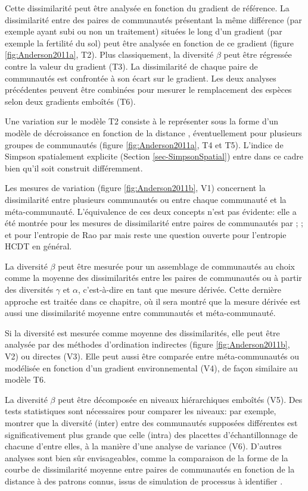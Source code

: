 \documentclass[
  11pt,
  french,
  a4paper,
  extrafontsizes,onecolumn,openright
  ]{memoir}
\begin{document}
Cette dissimilarité peut être analysée en fonction du gradient de référence.
La dissimilarité entre des paires de communautés présentant la même différence (par exemple ayant subi ou non un traitement) situées le long d'un gradient (par exemple la fertilité du sol) peut être analysée en fonction de ce gradient (figure \ref{fig:Anderson2011a}, T2).
Plus classiquement, la diversité \(\beta\) peut être régressée contre la valeur du gradient (T3).
La dissimilarité de chaque paire de communautés est confrontée à son écart sur le gradient.
Les deux analyses précédentes peuvent être combinées pour mesurer le remplacement des espèces selon deux gradients emboîtés (T6).

Une variation sur le modèle T2 consiste à le représenter sous la forme d'un modèle de décroissance en fonction de la distance \autocite{Nekola1999}, éventuellement pour plusieurs groupes de communautés (figure \ref{fig:Anderson2011a}, T4 et T5).
L'indice de Simpson spatialement explicite (Section \ref{sec-SimpsonSpatial}) entre dans ce cadre bien qu'il soit construit différemment.

Les mesures de variation (figure \ref{fig:Anderson2011b}, V1) concernent la dissimilarité entre plusieurs communautés ou entre chaque communauté et la méta-communauté.
L'équivalence de ces deux concepts n'est pas évidente: elle a été montrée pour les mesures de dissimilarité entre paires de communautés par \textcite{Legendre1999}; \textcite{Legendre2001}; \textcite{Legendre2005} et pour l'entropie de Rao par \textcite{Pavoine2004} mais reste une question ouverte pour l'entropie HCDT en général.

La diversité \(\beta\) peut être mesurée pour un assemblage de communautés au choix comme la moyenne des dissimilarités entre les paires de communautés ou à partir des diversités \(\gamma\) et \(\alpha\), c'est-à-dire en tant que mesure dérivée.
Cette dernière approche est traitée dans ce chapitre, où il sera montré que la mesure dérivée est aussi une dissimilarité moyenne entre communautés et méta-communauté.

Si la diversité est mesurée comme moyenne des dissimilarités, elle peut être analysée par des méthodes d'ordination indirectes (figure \ref{fig:Anderson2011b}, V2) ou directes (V3). Elle peut aussi être comparée entre méta-communautés ou modélisée en fonction d'un gradient environnemental (V4), de façon similaire au modèle T6.

La diversité \(\beta\) peut être décomposée en niveaux hiérarchiques emboîtés (V5). Des tests statistiques sont nécessaires pour comparer les niveaux: par exemple, montrer que la diversité (inter) entre des communautés supposées différentes est significativement plus grande que celle (intra) des placettes d'échantillonnage de chacune d'entre elles, à la manière d'une analyse de variance (V6).
D'autres analyses sont bien sûr envisageables, comme la comparaison de la forme de la courbe de dissimilarité moyenne entre paires de communautés en fonction de la distance à des patrons connus, issus de simulation de processus à identifier \autocite{Rejou-Mechain2011}.
\end{document}
